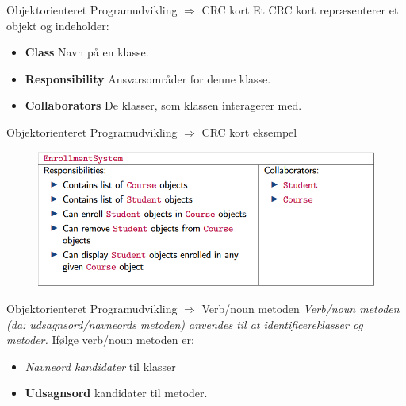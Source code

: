 \documentclass[10pt,aspectratio=1610]{beamer}
\begin{document}
\begin{frame}{Objektorienteret Programudvikling $\Rightarrow$ CRC kort}
  Et CRC kort repræsenterer et objekt og indeholder:
  \begin{itemize}
      \item \textbf{Class} Navn på en klasse.
      \item \textbf{Responsibility} Ansvarsområder for denne klasse.
      \item \textbf{Collaborators} De klasser, som klassen interagerer med.
  \end{itemize}
\end{frame}


\begin{frame}{Objektorienteret Programudvikling $\Rightarrow$ CRC kort eksempel}
    \begin{figure}
        \centering
        \includegraphics[width=\linewidth]{images/CRC.png}
    \end{figure}
\end{frame}

\begin{frame}{Objektorienteret Programudvikling $\Rightarrow$ Verb/noun metoden}
    \textit{Verb/noun metoden (da: udsagnsord/navneords metoden) anvendes til at identificereklasser og metoder.}
    \vspace{0.5cm}
    Ifølge verb/noun metoden er:
    \begin{itemize}
        \item \textit{Navneord kandidater} til klasser
        \item \textbf{Udsagnsord} kandidater til metoder.
    \end{itemize}
\end{frame}
\end{document}
